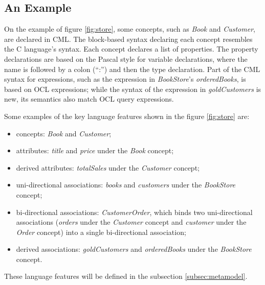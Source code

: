 \subsection{An Example}\label{subsec:example}

On the example of figure \ref{fig:store}, some concepts, such as \emph{Book} and \emph{Customer}, are declared in CML. 
The block-based syntax declaring each concept resembles the C \cite{clang} language's syntax. 
Each concept declares a list of properties.
The property declarations are based on the Pascal \cite{pascal} style for variable declarations,
where the name is followed by a colon (``:'') and then the type declaration.
Part of the CML syntax for expressions, such as the expression in \emph{BookStore}'s \emph{orderedBooks}, is based on OCL \cite{ocl} expressions; while the syntax of the expression in \emph{goldCustomers} is new, its semantics also match OCL \cite{ocl} query expressions.



Some examples of the key language features shown in the figure \ref{fig:store} are:
\begin{itemize}
\item concepts: \emph{Book} and \emph{Customer};
\item attributes: \emph{title} and \emph{price} under the \emph{Book} concept;  
\item derived attributes: \emph{totalSales} under the \emph{Customer} concept;
\item uni-directional associations: \emph{books} and \emph{customers} under the \emph{BookStore} concept;
\item bi-directional associations: \emph{CustomerOrder},
which binds two uni-directional associations (\emph{orders} under the \emph{Customer} concept and \emph{customer} under the \emph{Order} concept) into a single bi-directional association;
\item derived associations: \emph{goldCustomers} and \emph{orderedBooks} under the \emph{BookStore} concept.
\end{itemize}

These language features will be defined in the subsection \ref{subsec:metamodel}.